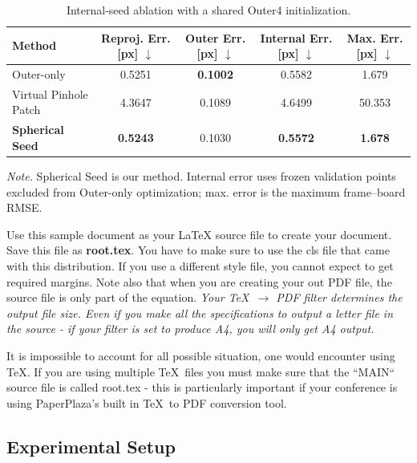\documentclass[letterpaper, 10 pt, conference]{ieeeconf}  %
\begin{document}
\begin{table}[t]
\centering
\caption{Internal-seed ablation with a shared Outer4 initialization.}
\label{tab:internal_seed_ablation}
\footnotesize
\setlength{\tabcolsep}{1.5pt}
\renewcommand{\arraystretch}{1.05}
\begin{tabular}{@{}lcccc@{}}
\toprule
Method
& \shortstack{Reproj.\\[-1pt]Err. [px] $\downarrow$}
& \shortstack{Outer\\[-1pt]Err. [px] $\downarrow$}
& \shortstack{Internal\\[-1pt]Err. [px] $\downarrow$}
& \shortstack{Max.\\[-1pt]Err. [px] $\downarrow$} \\
\midrule
Outer-only & 0.5251 & \textbf{0.1002} & 0.5582 & 1.679 \\
Virtual Pinhole Patch & 4.3647 & 0.1089 & 4.6499 & 50.353 \\
\textbf{Spherical Seed} & \textbf{0.5243} & 0.1030 & \textbf{0.5572} & \textbf{1.678} \\
\bottomrule
\end{tabular}
\vspace{2pt}
\parbox{\columnwidth}{\scriptsize \textit{Note.} Spherical Seed is our method. Internal error uses frozen validation points excluded from Outer-only optimization; max. error is the maximum frame--board RMSE.}
\end{table}

Use this sample document as your LaTeX source file to create your document. Save this file as {\bf root.tex}. You have to make sure to use the cls file that came with this distribution. If you use a different style file, you cannot expect to get required margins. Note also that when you are creating your out PDF file, the source file is only part of the equation. {\it Your \TeX\ $\rightarrow$ PDF filter determines the output file size. Even if you make all the specifications to output a letter file in the source - if your filter is set to produce A4, you will only get A4 output. }

It is impossible to account for all possible situation, one would encounter using \TeX. If you are using multiple \TeX\ files you must make sure that the ``MAIN`` source file is called root.tex - this is particularly important if your conference is using PaperPlaza's built in \TeX\ to PDF conversion tool.

\subsection{Experimental Setup}
\end{document}
